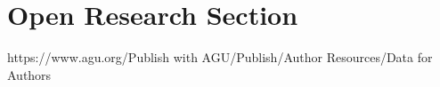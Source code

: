 \documentclass[draft]{agujournal2019}
\begin{document}




%
%

\section*{Open Research Section}
https://www.agu.org/Publish with AGU/Publish/Author Resources/Data for Authors
\end{document}
